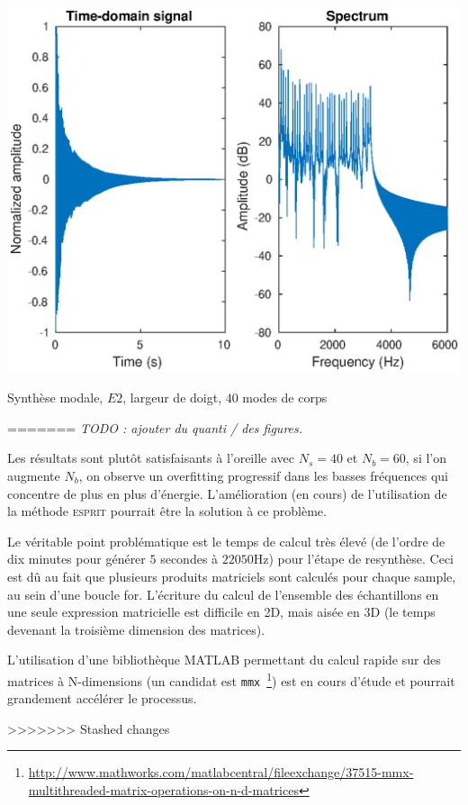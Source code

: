 \begin{table}[hpbt]
\centering
\includegraphics[scale=0.6]{figures/modal_synthesis-E2-40_string_modes-15_body_modes-finger_pluck.eps}
 \caption{Synthèse modale, \( E2 \), largeur de doigt, \( 40 \) modes de corps
 \label{fig:synth:modal_synth}}
\end{table}

% 
=======
  \emph{TODO : ajouter du quanti / des figures.}
  
  Les résultats sont plutôt satisfaisants à l'oreille avec \( N_s = 40 \) et
\( N_b = 60 \), si l'on augmente \( N_b \), on observe un overfitting
progressif dans les basses fréquences qui concentre de plus en plus d'énergie.
L'amélioration (en cours) de l'utilisation de la méthode \textsc{esprit}
pourrait être la solution à ce problème.

Le véritable point problématique est le temps de calcul très élevé (de l'ordre
de dix minutes pour générer \( 5 \) secondes à \( \si{22050\hertz{}} \))
pour l'étape de resynthèse. Ceci est dû au fait que plusieurs produits
matriciels sont calculés pour chaque sample, au sein d'une boucle for.
L'écriture du calcul de l'ensemble des échantillons en une seule expression
matricielle est difficile en 2D, mais aisée en 3D (le temps devenant la
troisième dimension des matrices).

  L'utilisation d'une bibliothèque MATLAB permettant du calcul rapide sur
des matrices à N-dimensions (un candidat est
\texttt{mmx}~\footnote{%
\url{http://www.mathworks.com/matlabcentral/fileexchange/37515-mmx-multithreaded-matrix-operations-on-n-d-matrices}})
est en cours d'étude et pourrait grandement accélérer le processus.

>>>>>>> Stashed changes

